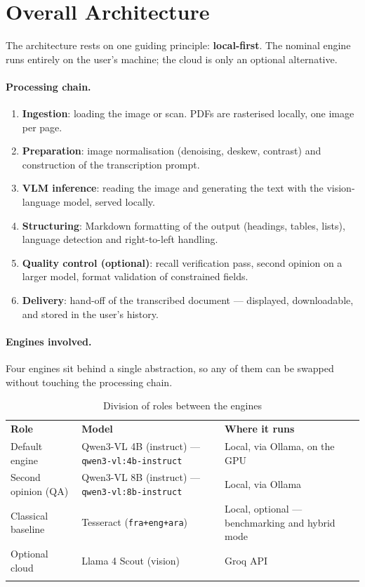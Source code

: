 \documentclass[11pt,a4paper]{article}
\newcommand{\toprule}{\noalign{\hrule height 0.9pt}\noalign{\vskip 3pt}}
\newcommand{\midrule}{\noalign{\vskip 3pt}\noalign{\hrule height 0.4pt}\noalign{\vskip 3pt}}
\newcommand{\bottomrule}{\noalign{\vskip 3pt}\noalign{\hrule height 0.9pt}}
\begin{document}
\section{Overall Architecture}

The architecture rests on one guiding principle: \textbf{local-first}. The
nominal engine runs entirely on the user's machine; the cloud is only an
optional alternative.

\paragraph{Processing chain.}
\begin{enumerate}
  \item \textbf{Ingestion}: loading the image or scan. PDFs are rasterised
        locally, one image per page.
  \item \textbf{Preparation}: image normalisation (denoising, deskew, contrast)
        and construction of the transcription prompt.
  \item \textbf{VLM inference}: reading the image and generating the text with
        the vision-language model, served locally.
  \item \textbf{Structuring}: Markdown formatting of the output (headings,
        tables, lists), language detection and right-to-left handling.
  \item \textbf{Quality control (optional)}: recall verification pass, second
        opinion on a larger model, format validation of constrained fields.
  \item \textbf{Delivery}: hand-off of the transcribed document --- displayed,
        downloadable, and stored in the user's history.
\end{enumerate}

\paragraph{Engines involved.}
Four engines sit behind a single abstraction, so any of them can be swapped
without touching the processing chain.

\begin{table}[H]
\centering
\begin{tabular}{@{}L{3.2cm}L{5.6cm}L{5.2cm}@{}}
\toprule
\textbf{Role} & \textbf{Model} & \textbf{Where it runs} \\
\midrule
Default engine & Qwen3-VL 4B (instruct) --- \texttt{qwen3-vl:4b-instruct} &
  Local, via Ollama, on the GPU \\
Second opinion (QA) & Qwen3-VL 8B (instruct) --- \texttt{qwen3-vl:8b-instruct} &
  Local, via Ollama \\
Classical baseline & Tesseract (\texttt{fra+eng+ara}) &
  Local, optional --- benchmarking and hybrid mode \\
Optional cloud & Llama 4 Scout (vision) & Groq API \\
\bottomrule
\end{tabular}
\caption{Division of roles between the engines}
\end{table}
\end{document}
